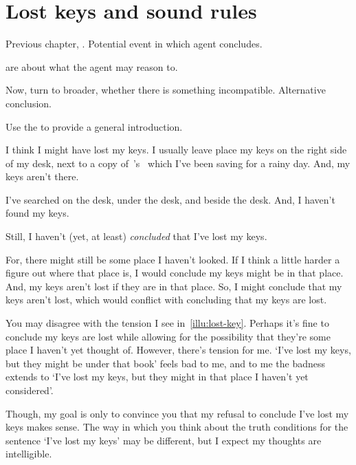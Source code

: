 \chapter{Lost keys and sound rules}
\label{cha:zS:sec:lost-keys}

\begin{note}
  Previous chapter, .
  Potential event in which agent concludes.

   are about what the agent may reason to.

  Now, turn to broader, whether there is something incompatible.
  Alternative conclusion.
\end{note}

\begin{note}
  Use the \illu{} to provide a general introduction.
\end{note}

\begin{note}
  \begin{scenario}
    \label{illu:lost-key}
    I think I might have lost my keys.
    I usually leave place my keys on the right side of my desk, next to a copy of~\citeauthor{Vickers:1989tr}'s~ which I've been saving for a rainy day.
    And, my keys aren't there.

    I've searched on the desk, under the desk, and beside the desk.
    And, I haven't found my keys.

    Still, I haven't (yet, at least) \emph{concluded} that I've lost my keys.

    For, there might still be some place I haven't looked.
    If I think a little harder a figure out where that place is, I would conclude my keys might be in that place.
    And, my keys aren't lost if they are in that place.
    So, I might conclude that my keys aren't lost, which would conflict with concluding that my keys are lost.
  \end{scenario}

  You may disagree with the tension I see in~\autoref{illu:lost-key}.
  Perhaps it's fine to conclude my keys are lost while allowing for the possibility that they're some place I haven't yet thought of.
  However, there's tension for me.
  `I've lost my keys, but they might be under that book' feels bad to me, and to me the badness extends to `I've lost my keys, but they might in that place I haven't yet considered'.

  Though, my goal is only to convince you that my refusal to conclude I've lost my keys makes sense.
  The way in which you think about the truth conditions for the sentence `I've lost my keys' may be different, but I expect my thoughts are intelligible.
\end{note}


